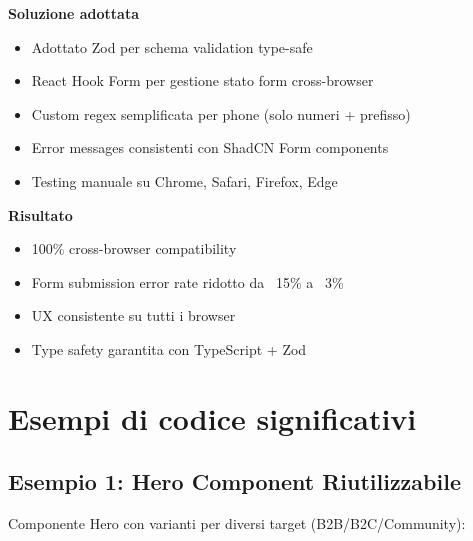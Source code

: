 \textbf{Soluzione adottata}
\begin{itemize}
  \item Adottato Zod per schema validation type-safe
  \item React Hook Form per gestione stato form cross-browser
  \item Custom regex semplificata per phone (solo numeri + prefisso)
  \item Error messages consistenti con ShadCN Form components
  \item Testing manuale su Chrome, Safari, Firefox, Edge
\end{itemize}

\textbf{Risultato}
\begin{itemize}
  \item 100\% cross-browser compatibility
  \item Form submission error rate ridotto da ~15\% a ~3\%
  \item UX consistente su tutti i browser
  \item Type safety garantita con TypeScript + Zod
\end{itemize}

\section{Esempi di codice significativi}

\subsection{Esempio 1: Hero Component Riutilizzabile}
Componente Hero con varianti per diversi target (B2B/B2C/Community):

